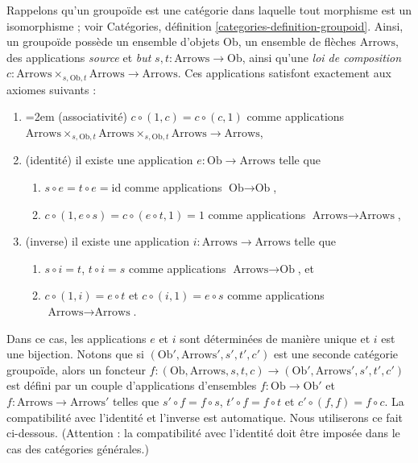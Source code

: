 \noindent
Rappelons qu'un groupoïde est une catégorie dans laquelle tout morphisme
est un isomorphisme ; voir
Catégories, définition \ref{categories-definition-groupoid}.
Ainsi, un groupoïde possède un ensemble d'objets $\text{Ob}$,
un ensemble de flèches $\text{Arrows}$, des applications {\it source} et {\it but}
$s, t : \text{Arrows} \to \text{Ob}$, ainsi qu'une {\it loi de composition}
$c : \text{Arrows} \times_{s, \text{Ob}, t} \text{Arrows}
\to \text{Arrows}$.
Ces applications satisfont exactement aux axiomes suivants :
\begin{enumerate}
\item {\emergencystretch=2em (associativité) $c \circ (1, c) = c \circ (c, 1)$ comme applications
$\text{Arrows} \times_{s, \text{Ob}, t}
\text{Arrows} \times_{s, \text{Ob}, t}
\text{Arrows} \to \text{Arrows}$,\par}
\item (identité) il existe une application $e : \text{Ob} \to \text{Arrows}$
telle que
\begin{enumerate}
\item $s \circ e = t \circ e = \text{id}$ comme applications $\text{Ob} \to \text{Ob}$,
\item $c \circ (1, e \circ s) = c \circ (e \circ t, 1) = 1$
comme applications $\text{Arrows} \to \text{Arrows}$,
\end{enumerate}
\item (inverse) il existe une application $i : \text{Arrows} \to \text{Arrows}$
telle que
\begin{enumerate}
\item $s \circ i = t$, $t \circ i = s$ comme applications $\text{Arrows} \to \text{Ob}$,
et
\item $c \circ (1, i) = e \circ t$ et $c \circ (i, 1) = e \circ s$
comme applications $\text{Arrows} \to \text{Arrows}$.
\end{enumerate}
\end{enumerate}
Dans ce cas, les applications $e$ et $i$ sont déterminées de manière unique et
$i$ est une bijection. Notons que si $(\text{Ob}', \text{Arrows}', s', t', c')$
est une seconde catégorie groupoïde, alors un foncteur
$f : (\text{Ob}, \text{Arrows}, s, t, c) \to
(\text{Ob}', \text{Arrows}', s', t', c')$
est défini par un couple d'applications d'ensembles $f : \text{Ob} \to \text{Ob}'$ et
$f : \text{Arrows} \to \text{Arrows}'$ telles que
$s' \circ f = f \circ s$, $t' \circ f = f \circ t$ et
$c' \circ (f, f) = f \circ c$. La compatibilité avec l'identité et
l'inverse est automatique. Nous utiliserons ce fait ci-dessous.
(Attention : la compatibilité avec l'identité
doit être imposée dans le cas des catégories générales.)

